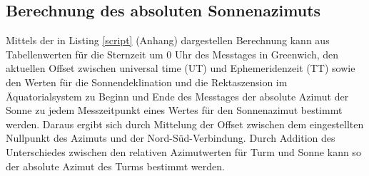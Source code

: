 \subsection{Berechnung des absoluten Sonnenazimuts}
Mittels der in Listing \ref{script} (Anhang) dargestellen Berechnung kann aus Tabellenwerten für die Sternzeit um 0 Uhr des Messtages in Greenwich, den aktuellen Offset zwischen universal time (UT) und Ephemeridenzeit (TT) sowie den Werten für die Sonnendeklination und die Rektaszension im Äquatorialsystem zu Beginn und Ende des Messtages der absolute Azimut der Sonne zu jedem Messzeitpunkt eines Wertes für den Sonnenazimut bestimmt werden. Daraus ergibt sich durch Mittelung der Offset zwischen dem eingestellten Nullpunkt des Azimuts und der Nord-Süd-Verbindung. 
Durch Addition des Unterschiedes zwischen den relativen Azimutwerten für Turm und Sonne kann so der absolute Azimut des Turms bestimmt werden. 